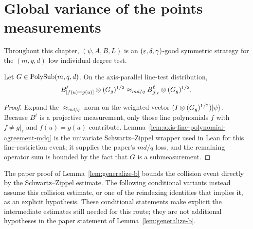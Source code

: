 \chapter{Global variance of the points measurements}
\label{chap:variance}
\label{sec:variance}

Throughout this chapter, $(\psi,A,B,L)$ is an $(\varepsilon,\delta,\gamma)$-good symmetric strategy for the $(m,q,d)$ low individual degree test.


\begin{lemma}\label{lem:generalize-b}
	\leanok
	Let $G \in \mathrm{PolySub}(m,q,d)$. On the axis-parallel line-test distribution,
	\[
		B^{\ell}_{[f(u)=g(u)]} \otimes (G_g)^{1/2}
		\approx_{md/q}
		B^{\ell}_{g|_{\ell}} \otimes (G_g)^{1/2}.
	\]
\end{lemma}
\begin{proof}
	\leanok
	Expand the $\approx_{md/q}$ norm on the weighted vector $(I\otimes (G_g)^{1/2})\lvert \psi \rangle$. Because $B^\ell$ is a projective measurement, only those line polynomials $f$ with $f\ne g|_\ell$ and $f(u)=g(u)$ contribute. Lemma~\ref{lem:axis-line-polynomial-agreement-mdq} is the univariate Schwartz--Zippel wrapper used in Lean for this line-restriction event; it supplies the paper's $md/q$ loss, and the remaining operator sum is bounded by the fact that $G$ is a submeasurement.
\end{proof}

\begin{remark}\label{rem:generalize-b-collision-residual-conditional}
	The paper proof of Lemma~\ref{lem:generalize-b} bounds the collision event
	directly by the Schwartz--Zippel estimate.  The following conditional variants
	instead assume this collision estimate, or one of the reindexing identities
	that implies it, as an explicit hypothesis.  These conditional statements
	make explicit the intermediate estimates still needed for this route; they
	are not additional hypotheses in the paper statement of
	Lemma~\ref{lem:generalize-b}.
\end{remark}

